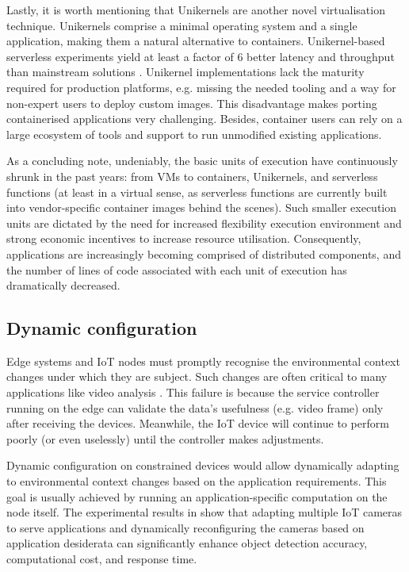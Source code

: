 Lastly, it is worth mentioning that Unikernels \cite{unikernels} are another novel virtualisation technique. Unikernels comprise a minimal operating system and a single application, making them a natural alternative to containers. Unikernel-based serverless experiments yield at least a factor of 6 better latency and throughput than mainstream solutions \cite{unikernels-performance}. Unikernel implementations lack the maturity required for production platforms, e.g. missing the needed tooling and a way for non-expert users to deploy custom images. This disadvantage makes porting containerised applications very challenging. Besides, container users can rely on a large ecosystem of tools and support to run unmodified existing applications.

As a concluding note, undeniably, the basic units of execution have continuously shrunk in the past years: from VMs to containers, Unikernels, and serverless functions (at least in a virtual sense, as serverless functions are currently built into vendor-specific container images behind the scenes). Such smaller execution units are dictated by the need for increased flexibility execution environment and strong economic incentives to increase resource utilisation. Consequently, applications are increasingly becoming comprised of distributed components, and the number of lines of code associated with each unit of execution has dramatically decreased.

\subsection{Dynamic configuration}

Edge systems and IoT nodes must promptly recognise the environmental context changes under which they are subject. Such changes are often critical to many applications like video analysis \cite{camera-virtualisation}. This failure is because the service controller running on the edge can validate the data's usefulness (e.g. video frame) only after receiving the devices. Meanwhile, the IoT device will continue to perform poorly (or even uselessly) until the controller makes adjustments.

Dynamic configuration on constrained devices would allow dynamically adapting to environmental context changes based on the application requirements. This goal is usually achieved by running an application-specific computation on the node itself. The experimental results in \cite{camera-virtualisation} show that adapting multiple IoT cameras to serve applications and dynamically reconfiguring the cameras based on application desiderata can significantly enhance object detection accuracy, computational cost, and response time.


